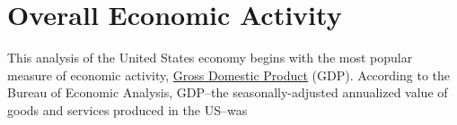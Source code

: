 \documentclass{report}
\begin{document}
\section*{\color{darkgray} \LARGE  \seriffont Overall Economic Activity}
\label{sec:oea}
\begin{minipage}{0.61\textwidth}
\small This analysis of the United States economy begins with the most popular measure of economic activity, \href{https://www.bea.gov/data/gdp/gross-domestic-product}{Gross Domestic Product} (GDP). According to the Bureau of Economic Analysis, GDP--the seasonally-adjusted annualized value of goods and services produced in the US--was \\

\\
\end{minipage}\hfill
\begin{minipage}{0.34\textwidth}
\\
\end{minipage}
\end{document}
